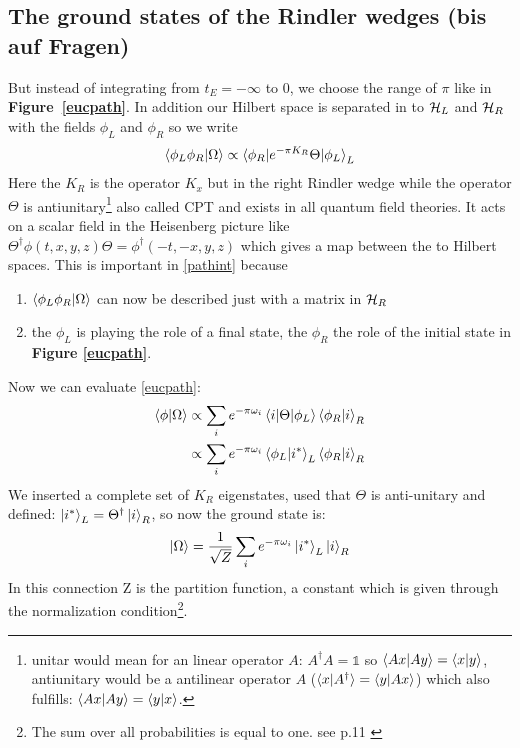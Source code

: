 \subsection{The ground states of the Rindler wedges \checkmark (bis auf Fragen)}
	But instead of integrating from $t_E= -\infty$ to 0, we choose the range of $\pi$ like in \textbf{Figure~\ref{eucpath}}. In addition our Hilbert space is separated in to $\mathcal{H}_L$ and $\mathcal{H}_R$ with the fields $\phi_L$ and $\phi_R$ so we write 
	\begin{align} \label{pathint}
		\braket{\phi_L \phi_R | \Omega} \propto \braket{\phi_R| e^{-\pi K_R} \Theta| \phi_L}_L
	\end{align}
	Here the $K_R$ is the operator $K_x$ but in the right Rindler wedge while the operator $\Theta$ is antiunitary\footnote{unitar would mean for an linear operator $A$: $A^\dagger A = \mathds{1}$ so $\braket{Ax|Ay}=\braket{x|y}$, antiunitary would be a antilinear operator $A$ ($\braket{x|A^\dagger}=\braket{y|Ax}$) which also fulfills: $\braket{Ax|Ay}=\braket{y|x}$. } also called CPT and exists in all quantum field theories. It acts on a scalar field in the Heisenberg picture like $\Theta^\dagger \phi(t,x,y,z)\Theta = \phi^\dagger(-t,-x,y,z)$ which gives a map between the to Hilbert spaces. This is important in \eqref{pathint} because 
		\begin{enumerate}
			\item $\braket{\phi_L \phi_R| \Omega}$ can now be described just with a matrix in $\mathcal{H}_R$
			\item the $\phi_L$ is playing the role of a final state, the $\phi_R$ the role of the initial state in \textbf{Figure \ref{eucpath}}.
		\end{enumerate}
	Now we can evaluate \eqref{eucpath}:
	\begin{align}
		\braket{\phi|\Omega} &\propto \sum_i e^{-\pi \omega_i} \braket{i | \Theta | \phi_L} \braket{\phi_R|i}_R \nonumber\\
		&\propto \sum_i e^{-\pi \omega_i} \braket{\phi_L| i^*}_L\braket{\phi_R|i}_R
	\end{align} %
	We inserted a complete set of  $K_R$ eigenstates, used that $\Theta$ is anti-unitary and defined: $\ket{i^*}_L = \Theta^\dagger \ket{i}_R$, so now the ground state is:
	\begin{align}
		\ket{\Omega} = \frac{1}{\sqrt{Z}} \sum_i  e^{-\pi \omega_i} \ket{i^*}_L \ket{i}_R 
	\end{align}
	In this connection Z is the partition function, a constant which is given through the normalization condition\footnote{The sum over all probabilities is equal to one. see p.11 \cite{Brenig}}. 
	
